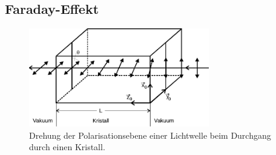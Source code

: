 \subsection{Faraday-Effekt}

\begin{figure}
    \centering
    \includegraphics[width=0.7\textwidth]{content/grafik/drehung.pdf}
    \caption{Drehung der Polarisationsebene einer Lichtwelle beim Durchgang durch einen Kristall. \cite{faraday}}
    \label{fig:drehung}
    \hfill
\end{figure}
